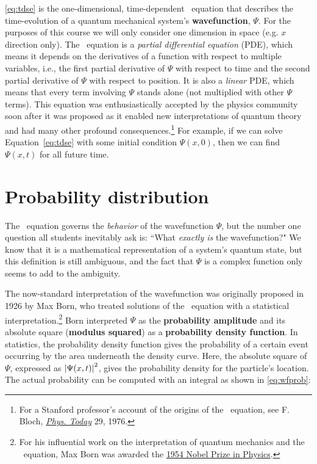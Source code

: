 \autoref{eq:tdse} is the one-dimensional, time-dependent \Sch\ equation that describes the time-evolution of a quantum mechanical system's \textbf{wavefunction}, $\Psi$. 
For the purposes of this course we will only consider one dimension in space (e.g. $x$ direction only). 
The \Sch\ equation is a \emph{partial differential equation} (PDE), which means it depends on the derivatives of a function with respect to multiple variables, i.e., the first partial derivative of $\Psi$ with respect to time and the second partial derivative of $\Psi$ with respect to position. 
It is also a \emph{linear} PDE, which means that every term involving $\Psi$ stands alone (not multiplied with other $\Psi$ terms).
This equation was enthusiastically accepted by the physics community soon after it was proposed as it enabled new interpretations of quantum theory and had many other profound consequences.\footnote{For a Stanford professor's account of the origins of the \Sch\ equation, see F. Bloch, \href{http://physicstoday.scitation.org/doi/pdf/10.1063/1.3024633}{\emph{Phys. Today}} 29, 1976.} 
For example, if we can solve Equation~\ref{eq:tdse} with some initial condition $\Psi(x,0)$, then we can find $\Psi(x,t)$ for all future time.


\section{Probability distribution} \label{sec:prob}

The \Sch\ equation governs the \emph{behavior} of the wavefunction $\Psi$, but the number one question all students inevitably ask is: ``What \emph{exactly is} the wavefunction?" 
We know that it is a mathematical representation of a system's quantum state, but this definition is still ambiguous, and the fact that $\Psi$ is a complex function only seems to add to the ambiguity. 

The now-standard interpretation of the wavefunction was originally proposed in 1926 by Max Born, who treated solutions of the \Sch\ equation with a statistical interpretation.\footnote{For his influential work on the interpretation of quantum mechanics and the \Sch\ equation, Max Born was awarded the \href{https://www.nobelprize.org/prizes/physics/1954/summary/}{1954 Nobel Prize in Physics}.} 
Born interpreted $\Psi$ as the \textbf{probability amplitude} and its absolute square (\textbf{modulus squared}) as a \textbf{probability density function}. 
In statistics, the probability density function gives the probability of a certain event occurring by the area underneath the density curve. 
Here, the absolute square of $\Psi$, expressed as $\abs{\Psi(x,t)}^2$, gives the probability density for the particle's location. 
The actual probability can be computed with an integral as shown in \autoref{eq:wfprob}:

